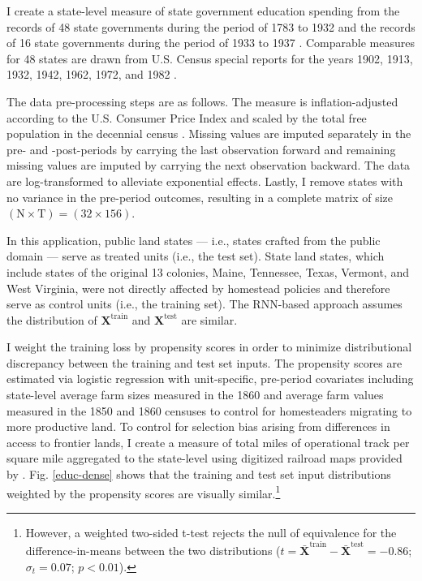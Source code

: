 \documentclass[hidelinks,12pt]{article}
\begin{document}
I create a state-level measure of state government education spending from the records of 48 state governments during the period of 1783 to 1932 \citep{sylla1993sources} and the records of 16 state governments during the period of 1933 to 1937 \citep{sylla1995sourcesa,sylla1995sourcesb}. Comparable measures for 48 states are drawn from U.S. Census special reports for the years 1902, 1913, 1932, 1942, 1962, 1972, and 1982 \citep{haines2010}.

The data pre-processing steps are as follows. The measure is inflation-adjusted according to the U.S. Consumer Price Index \citep{williamson2017seven} and scaled by the total free population in the decennial census \citep{haines2010}. Missing values are imputed separately in the pre- and -post-periods by carrying the last observation forward and remaining missing values are imputed by carrying the next observation backward. The data are log-transformed to alleviate exponential effects. Lastly, I remove states with no variance in the pre-period outcomes, resulting in a complete matrix of size $(\text{N} \times \text{T})= (32 \times 156)$. 

In this application, public land states --- i.e., states crafted from the public domain --- serve as treated units (i.e., the test set). State land states, which include states of the original 13 colonies, Maine, Tennessee, Texas, Vermont, and West Virginia, were not directly affected by homestead policies and therefore serve as control units (i.e., the training set). The RNN-based approach assumes the distribution of $\boldsymbol{X}^{\text{train}}$ and $\boldsymbol{X}^{\text{test}}$ are similar.

I weight the training loss by  propensity scores in order to minimize distributional discrepancy between the training and test set inputs. The propensity scores are estimated via logistic regression with unit-specific, pre-period covariates including state-level average farm sizes measured in the 1860 and average farm values measured in the 1850 and 1860 censuses \citep{haines2010} to control for homesteaders migrating to more productive land. To control for selection bias arising from differences in access to frontier lands, I create a measure of total miles of operational track per square mile aggregated to the state-level using digitized railroad maps provided by \citet{atack2013use}. Fig. \ref{educ-dense} shows that the training and test set input distributions weighted by the propensity scores are visually similar.\footnote{However, a weighted two-sided t-test rejects the null of equivalence for the difference-in-means between the two distributions ($t= \boldsymbol{\bar{X}}^{\text{train}} - \boldsymbol{\bar{X}}^{\text{test}} = -0.86$; $\sigma_t = 0.07$; $p < 0.01$).} 
\end{document}
